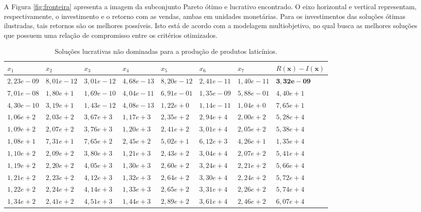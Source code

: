 \documentclass [11pt]{articleSBPO}
\begin{document}
A Figura \ref{fig:fronteira} apresenta a imagem da subconjunto Pareto ótimo e lucrativo encontrado. O eixo horizontal e vertical representam, respectivamente, o investimento e o retorno com as vendas, ambas em unidades monetárias. Para os investimentos das soluções ótimas ilustradas, tais retornos são os melhores possíveis. Isto está de acordo com a modelagem multiobjetivo, no qual busca as melhores soluções que possuem uma relação de compromisso entre os critérios otimizados.

\begin{table}
	\centering
	\scriptsize
	\caption{Soluções lucrativas não dominadas para a produção de produtos laticínios.}
	\begin{tabular}{|m{1.3cm}|m{1.3cm}|m{1.3cm}|m{1.3cm}|m{1.3cm}|m{1.3cm}|m{1.3cm}||m{1.5cm}|}
		\hline
		 $ x_1 $ & $ x_2 $ & $ x_3 $ & $ x_4 $ & $ x_5 $ & $ x_6 $ & $ x_7 $ & $ R(\mathbf{x}) - I(\mathbf{x}) $ \\
		\hline
		 $ 2,23e-09 $ & $ 8,01e-12 $ & $ 3,01e-12 $ & $ 4,68e-13 $ & $ 8,20e-12 $ & $ 2,41e-11 $ & $ 1,40e-11 $ & $ \mathbf{3,32e-09} $ \\
		 $ 7,01e-08 $ & $ 1,80e+1 $ & $ 1,69e-10 $ & $ 4,04e-11 $ & $ 6,91e-01 $ & $ 1,35e-09 $ & $ 5,88e-01 $ & $ 4,40e+1 $ \\
		 $ 4,30e-10 $ & $ 3,19e+1 $ & $ 1,43e-12 $ & $ 4,08e-13 $ & $ 1,22e+0 $ & $ 1,14e-11 $ & $ 1,04e+0 $ & $ 7,65e+1 $ \\
		 $ 1,06e+2 $ & $ 2,03e+2 $ & $ 3,67e+3 $ & $ 1,17e+3 $ & $ 2,35e+2 $ & $ 2,94e+4 $ & $ 2,00e+2 $ & $ 5,28e+4 $ \\
		 $ 1,09e+2 $ & $ 2,07e+2 $ & $ 3,76e+3 $ & $ 1,20e+3 $ & $ 2,41e+2 $ & $ 3,01e+4 $ & $ 2,05e+2 $ & $ 5,38e+4 $ \\
		 $ 1,08e+1 $ & $ 7,31e+1 $ & $ 7,65e+2 $ & $ 2,45e+2 $ & $ 5,02e+1 $ & $ 6,12e+3 $ & $ 4,26e+1 $ & $ 1,35e+4 $ \\
		 $ 1,10e+2 $ & $ 2,09e+2 $ & $ 3,80e+3 $ & $ 1,21e+3 $ & $ 2,43e+2 $ & $ 3,04e+4 $ & $ 2,07e+2 $ & $ 5,41e+4 $ \\
		 $ 1,19e+2 $ & $ 2,20e+2 $ & $ 4,05e+3 $ & $ 1,30e+3 $ & $ 2,60e+2 $ & $ 3,24e+4 $ & $ 2,21e+2 $ & $ 5,66e+4 $ \\
		 $ 1,21e+2 $ & $ 2,23e+2 $ & $ 4,12e+3 $ & $ 1,32e+3 $ & $ 2,64e+2 $ & $ 3,30e+4 $ & $ 2,24e+2 $ & $ 5,72e+4 $ \\
		 $ 1,22e+2 $ & $ 2,24e+2 $ & $ 4,14e+3 $ & $ 1,33e+3 $ & $ 2,65e+2 $ & $ 3,31e+4 $ & $ 2,26e+2 $ & $ 5,74e+4 $ \\
		 $ 1,34e+2 $ & $ 2,41e+2 $ & $ 4,51e+3 $ & $ 1,44e+3 $ & $ 2,89e+2 $ & $ 3,61e+4 $ & $ 2,46e+2 $ & $ 6,07e+4 $ \\

\end{tabular}
\end{table}
\end{document}
